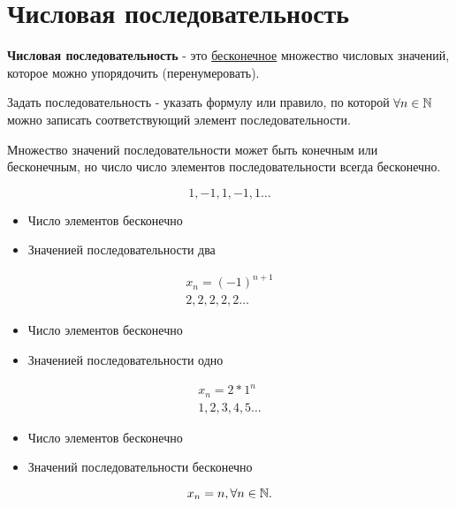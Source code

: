 
\section{Числовая последовательность}

\begin{definition}
  \textbf{Числовая последовательность} - это \underline{бесконечное} множество числовых значений, которое можно упорядочить (перенумеровать).
\end{definition}

Задать последовательность - указать формулу или правило, по которой $\forall n\in \mathbb{N}$ можно записать соответствующий элемент последовательности.

\begin{note}
  Множество значений последовательности может быть конечным или бесконечным, но число число элементов последовательности всегда бесконечно.
\end{note}

\begin{eg}
  \[
  1, -1, 1, -1, 1\ldots
  \]
  \begin{itemize}
    \item Число элементов бесконечно
    \item Значенией последовательности два
  \end{itemize}
\end{eg}
\begin{eg}
  \begin{gather*}
    x_n = (-1)^{n+1} \\
    2, 2, 2, 2, 2\ldots
  \end{gather*}
  \begin{itemize}
    \item Число элементов бесконечно
    \item Значенией последовательности одно
  \end{itemize}
\end{eg}
\begin{eg}
  \begin{gather*}
    x_{n} = 2*1^{n} \\
    1, 2, 3, 4, 5\ldots
  \end{gather*}
  \begin{itemize}
    \item Число элементов бесконечно
    \item Значений последовательности бесконечно
  \end{itemize}
  \[
    x_{n} = n, \forall n\in \mathbb{N}
  .\] 
\end{eg}

